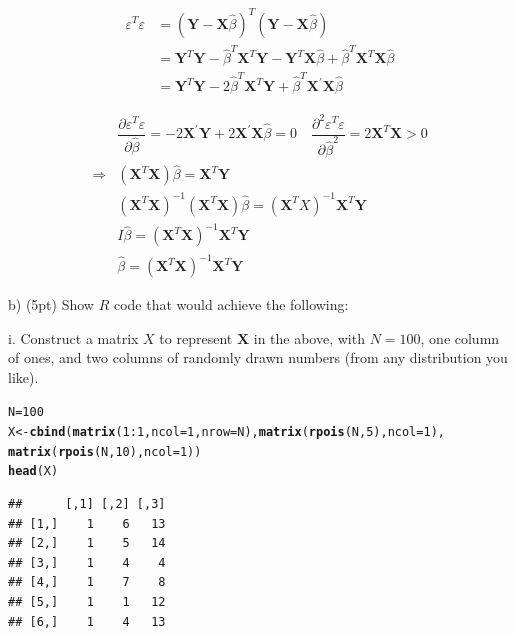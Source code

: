 \documentclass{article}\usepackage[]{graphicx}\usepackage[]{color}
\makeatletter
\newcommand{\hlnum}[1]{\textcolor[rgb]{0.686,0.059,0.569}{#1}}%
\newcommand{\hlopt}[1]{\textcolor[rgb]{0,0,0}{#1}}%
\newcommand{\hlstd}[1]{\textcolor[rgb]{0.345,0.345,0.345}{#1}}%
\newcommand{\hlkwb}[1]{\textcolor[rgb]{0.69,0.353,0.396}{#1}}%
\newcommand{\hlkwc}[1]{\textcolor[rgb]{0.333,0.667,0.333}{#1}}%
\newcommand{\hlkwd}[1]{\textcolor[rgb]{0.737,0.353,0.396}{\textbf{#1}}}%
\newenvironment{kframe}{%
 \def\at@end@of@kframe{}%
 \ifinner\ifhmode%
  \def\at@end@of@kframe{\end{minipage}}%
  \begin{minipage}{\columnwidth}%
 \fi\fi%
 \def\FrameCommand##1{\hskip\@totalleftmargin \hskip-\fboxsep
 \colorbox{shadecolor}{##1}\hskip-\fboxsep
     \hskip-\linewidth \hskip-\@totalleftmargin \hskip\columnwidth}%
 \MakeFramed {\advance\hsize-\width
   \@totalleftmargin\z@ \linewidth\hsize
   \@setminipage}}%
 {\par\unskip\endMakeFramed%
 \at@end@of@kframe}
\newenvironment{knitrout}{}{} %
\makeatother
\begin{document}
$$
\begin{aligned}
\varepsilon^{T} \varepsilon &=(\mathbf{Y}-\mathbf{X} \hat{\beta})^{T}(\mathbf{Y}-\mathbf{X} \hat{\beta}) \\
&=\mathbf{Y}^{T} \mathbf{Y}-\hat{\beta}^{T} \mathbf{X}^{T} \mathbf{Y}-\mathbf{Y}^{T} \mathbf{X} \hat{\beta}+\hat{\beta}^{T} \mathbf{X}^{T} \mathbf{X} \hat{\beta} \\
&=\mathbf{Y}^{T} \mathbf{Y}-2 \hat{\beta}^{T} \mathbf{X}^{T} \mathbf{Y}+\hat{\beta}^{T} \mathbf{X}^{\prime} \mathbf{X} \hat{\beta}
\end{aligned} 
$$


$$
\begin{aligned}
&\dfrac{\partial \varepsilon^{T} \varepsilon}{\partial \hat{\beta}}=-2 \mathbf{X}^{\prime} \mathbf{Y}+2 \mathbf{X}^{\prime} \mathbf{X} \hat{\beta}=0 \quad
\dfrac{\partial^2 \varepsilon^{T} \varepsilon}{\partial \hat{\beta}^2}= 2 \mathbf{X}^{T} \mathbf{X} >0
\\
\Rightarrow 
&\left(\mathbf{X}^{T} \mathbf{X}\right) \hat{\beta}=\mathbf{X}^{T} \mathbf{Y}
\\
&\left(\mathbf{X}^{T} \mathbf{X}\right)^{-1}\left(\mathbf{X}^{T} \mathbf{X}\right) \hat{\beta}=\left(\mathbf{X}^{T} X\right)^{-1} \mathbf{X}^{T}\mathbf{Y}
\\
&I \hat{\beta} =\left(\mathbf{X}^{T} \mathbf{X}\right)^{-1} \mathbf{X}^{T} \mathbf{Y} \\
&\hat{\beta} =\left(\mathbf{X}^{T} \mathbf{X}\right)^{-1} \mathbf{X}^{T} \mathbf{Y}
\end{aligned}
$$
\vspace*{0.5cm}


b) (5pt) Show $R$ code that would achieve the following:

i. Construct a matrix $X$ to represent $\mathbf{X}$ in the above, with $N=100$, one column of ones, and two columns of randomly drawn numbers (from any distribution you like).

\begin{knitrout}
\color{fgcolor}\begin{kframe}
\begin{alltt}
\hlstd{N} \hlkwb{=} \hlnum{100}
\hlstd{X} \hlkwb{<-} \hlkwd{cbind}\hlstd{(}\hlkwd{matrix}\hlstd{(}\hlnum{1}\hlopt{:}\hlnum{1}\hlstd{,} \hlkwc{ncol} \hlstd{=} \hlnum{1}\hlstd{,} \hlkwc{nrow} \hlstd{= N),}  \hlkwd{matrix}\hlstd{(}\hlkwd{rpois}\hlstd{(N,} \hlnum{5}\hlstd{),} \hlkwc{ncol} \hlstd{=} \hlnum{1}\hlstd{),}
           \hlkwd{matrix}\hlstd{(}\hlkwd{rpois}\hlstd{(N,} \hlnum{10}\hlstd{),} \hlkwc{ncol} \hlstd{=} \hlnum{1}\hlstd{))}
\hlkwd{head}\hlstd{(X)}
\end{alltt}
\begin{verbatim}
##      [,1] [,2] [,3]
## [1,]    1    6   13
## [2,]    1    5   14
## [3,]    1    4    4
## [4,]    1    7    8
## [5,]    1    1   12
## [6,]    1    4   13
\end{verbatim}
\end{kframe}
\end{knitrout}
\vspace*{0.5cm}
\end{document}
